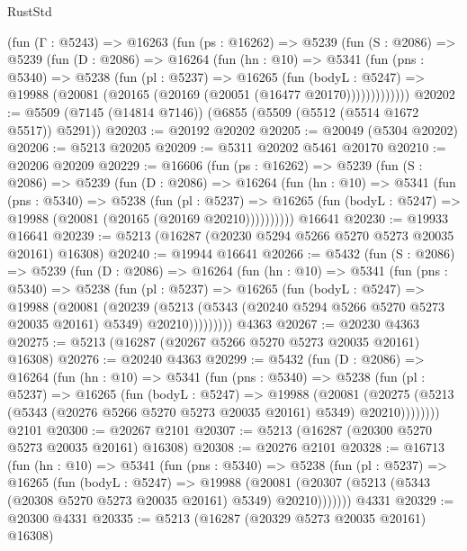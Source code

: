 \begin{lexlean}{RustStd}
\begin{coremodule}
    (fun (Γ : @5243) =>
    @16263
      (fun (ps : @16262) =>
      @5239
        (fun (S : @2086) =>
        @5239
          (fun (D : @2086) =>
          @16264
            (fun (hn : @10) =>
            @5341
              (fun (pns : @5340) =>
              @5238
                (fun (pl : @5237) =>
                @16265
                  (fun (bodyL : @5247) =>
                  @19988 (@20081 (@20165 (@20169 (@20051 (@16477 @20170)))))))))))))
@20202 := @5509 (@7145 (@14814 @7146)) (@6855 (@5509 (@5512 (@5514 @1672 @5517)) @5291))
@20203 := @20192 @20202
@20205 := @20049 (@5304 @20202)
@20206 := @5213 @20205
@20209 := @5311 @20202 @5461 @20170
@20210 := @20206 @20209
@20229 := @16606
    (fun (ps : @16262) =>
    @5239
      (fun (S : @2086) =>
      @5239
        (fun (D : @2086) =>
        @16264
          (fun (hn : @10) =>
          @5341
            (fun (pns : @5340) =>
            @5238
              (fun (pl : @5237) =>
              @16265 (fun (bodyL : @5247) => @19988 (@20081 (@20165 (@20169 @20210))))))))))
    @16641
@20230 := @19933 @16641
@20239 := @5213 (@16287 (@20230 @5294 @5266 @5270 @5273 @20035 @20161) @16308)
@20240 := @19944 @16641
@20266 := @5432
    (fun (S : @2086) =>
    @5239
      (fun (D : @2086) =>
      @16264
        (fun (hn : @10) =>
        @5341
          (fun (pns : @5340) =>
          @5238
            (fun (pl : @5237) =>
            @16265
              (fun (bodyL : @5247) =>
              @19988
                (@20081
                  (@20239
                    (@5213
                      (@5343 (@20240 @5294 @5266 @5270 @5273 @20035 @20161) @5349)
                      @20210)))))))))
    @4363
@20267 := @20230 @4363
@20275 := @5213 (@16287 (@20267 @5266 @5270 @5273 @20035 @20161) @16308)
@20276 := @20240 @4363
@20299 := @5432
    (fun (D : @2086) =>
    @16264
      (fun (hn : @10) =>
      @5341
        (fun (pns : @5340) =>
        @5238
          (fun (pl : @5237) =>
          @16265
            (fun (bodyL : @5247) =>
            @19988
              (@20081
                (@20275 (@5213 (@5343 (@20276 @5266 @5270 @5273 @20035 @20161) @5349) @20210))))))))
    @2101
@20300 := @20267 @2101
@20307 := @5213 (@16287 (@20300 @5270 @5273 @20035 @20161) @16308)
@20308 := @20276 @2101
@20328 := @16713
    (fun (hn : @10) =>
    @5341
      (fun (pns : @5340) =>
      @5238
        (fun (pl : @5237) =>
        @16265
          (fun (bodyL : @5247) =>
          @19988
            (@20081 (@20307 (@5213 (@5343 (@20308 @5270 @5273 @20035 @20161) @5349) @20210)))))))
    @4331
@20329 := @20300 @4331
@20335 := @5213 (@16287 (@20329 @5273 @20035 @20161) @16308)

\end{coremodule}
\end{lexlean}
